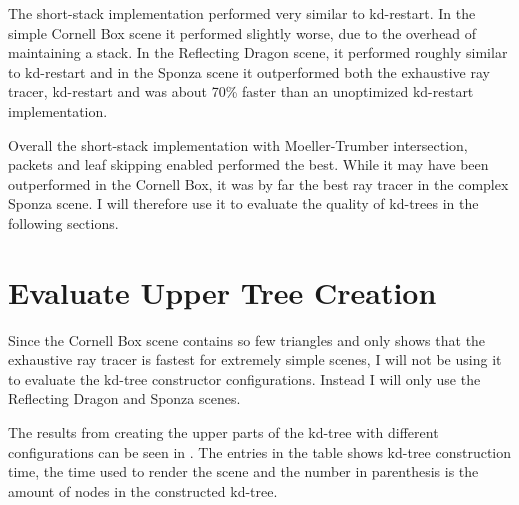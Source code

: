 The short-stack implementation performed very similar to kd-restart. In the
simple Cornell Box scene it performed slightly worse, due to the overhead of
maintaining a stack. In the Reflecting Dragon scene, it performed roughly
similar to kd-restart and in the Sponza scene it outperformed both the
exhaustive ray tracer, kd-restart and was about 70\% faster than an unoptimized
kd-restart implementation.

Overall the short-stack implementation with Moeller-Trumber intersection,
packets and leaf skipping enabled performed the best. While it may have been
outperformed in the Cornell Box, it was by far the best ray tracer in the
complex Sponza scene. I will therefore use it to evaluate the quality of
kd-trees in the following sections.


\section{Evaluate Upper Tree Creation}\label{sec:evaluateUpperTree}

Since the Cornell Box scene contains so few triangles and only shows that the
exhaustive ray tracer is fastest for extremely simple scenes, I will not be
using it to evaluate the kd-tree constructor configurations. Instead I will only
use the Reflecting Dragon and Sponza scenes.

The results from creating the upper parts of the kd-tree with different
configurations can be seen in . The entries in the
table shows kd-tree construction time, the time used to render the scene and the
number in parenthesis is the amount of nodes in the constructed kd-tree.


